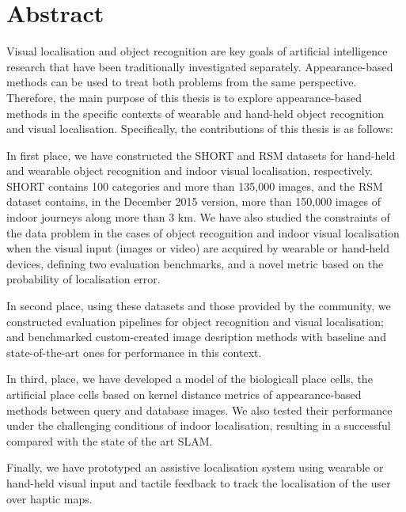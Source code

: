 \begingroup
\let\clearpage\relax
\let\cleardoublepage\relax
\let\cleardoublepage\relax

\chapter*{Abstract}

Visual localisation and object recognition are key goals of artificial intelligence research that have been traditionally investigated separately. Appearance-based methods can be used to treat both problems from the same perspective. Therefore, the main purpose of this thesis is to explore appearance-based methods in the specific contexts of wearable and hand-held object recognition and visual localisation. Specifically, the contributions of this thesis is as follows:

In first place, we have constructed the SHORT and RSM datasets for hand-held and wearable object recognition and indoor visual localisation, respectively. SHORT contains 100 categories and more than 135,000 images, and the RSM dataset contains, in the December 2015 version, more than 150,000 images of indoor journeys along more than 3 km. We have also studied the constraints of the data problem in the cases of object recognition and indoor visual localisation when the visual input (images or video) are acquired by wearable or hand-held devices, defining two evaluation benchmarks, and a novel metric based on the probability of localisation error. 

In second place, using these datasets and those provided by the community, we constructed evaluation pipelines for object recognition and visual localisation; and benchmarked custom-created image desription methods with baseline and state-of-the-art ones for performance in this context. 

In third, place, we have developed a model of the biologicall place cells, the artificial place cells based on kernel distance metrics of appearance-based methods between query and database images. We also tested their performance under the challenging conditions of indoor localisation, resulting in a successful compared with the state of the art SLAM. 

Finally, we have prototyped an assistive localisation system using wearable or hand-held visual input and tactile feedback to track the localisation of the user over haptic maps.


\vfill



\endgroup			

\vfill